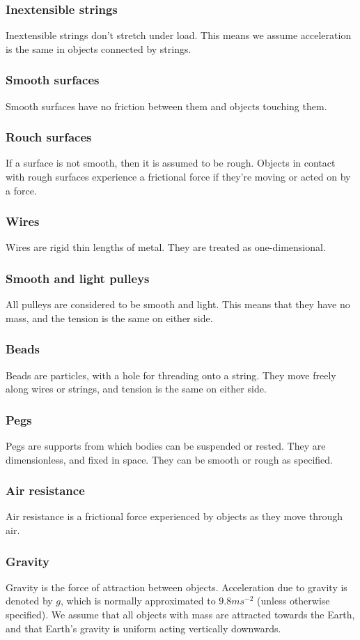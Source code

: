 \subsubsection{Inextensible strings}
Inextensible strings don't stretch under load. This means we assume acceleration is the same in objects connected by strings.
\subsubsection{Smooth surfaces}
Smooth surfaces have no friction between them and objects touching them.
\subsubsection{Rouch surfaces}
If a surface is not smooth, then it is assumed to be rough. Objects in contact with rough surfaces experience a frictional force if they're moving or acted on by a force.
\subsubsection{Wires}
Wires are rigid thin lengths of metal. They are treated as one-dimensional.
\subsubsection{Smooth and light pulleys}
All pulleys are considered to be smooth and light. This means that they have no mass, and the tension is the same on either side.
\subsubsection{Beads}
Beads are particles, with a hole for threading onto a string. They move freely along wires or strings, and tension is the same on either side.
\subsubsection{Pegs}
Pegs are supports from which bodies can be suspended or rested. They are dimensionless, and fixed in space. They can be smooth or rough as specified.
\subsubsection{Air resistance}
Air resistance is a frictional force experienced by objects as they move through air.
\subsubsection{Gravity}
Gravity is the force of attraction between objects. Acceleration due to gravity is denoted by $g$, which is normally approximated to $9.8ms^{-2}$ (unless otherwise specified). We assume that all objects with mass are attracted towards the Earth, and that Earth's gravity is uniform acting vertically downwards.

